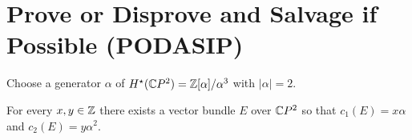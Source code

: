 \documentclass{homework}
\begin{document}
\section{Prove or Disprove and Salvage if Possible (PODASIP)}

\begin{problem}
  Choose a generator $\alpha$ of $H^\star(\mathbb{C}P^2) = \mathbb{Z}[\alpha]/\alpha^3$
  with $|\alpha| = 2$.

  For every $x, y \in \mathbb{Z}$ there exists a vector bundle $E$ over
  $\mathbb{C}P^2$ so that $c_1(E) = x \alpha$ and $c_2(E) = y \alpha^2$.
\end{problem}
\end{document}
